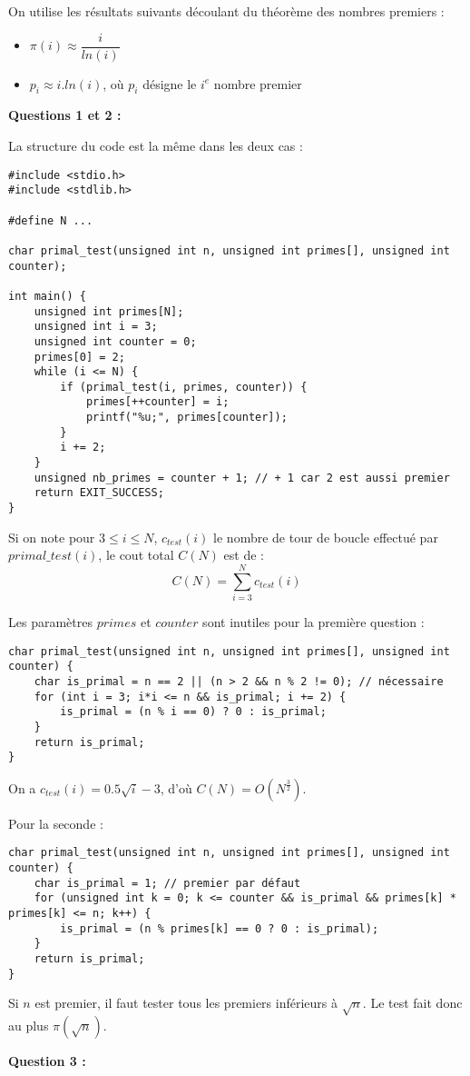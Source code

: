 \documentclass[../main.tex]{subfiles}
\begin{document}
On utilise les résultats suivants découlant du théorème des nombres premiers :
\begin{itemize}
	\item $\pi(i)\approx \dfrac{i}{ln(i)}$
	\item $p_i\approx i.ln(i)$, où $p_i$ désigne le $i^e$ nombre premier
\end{itemize}
\textbf{Questions 1 et 2 :}

La structure du code est la même dans les deux cas :
\begin{verbatim}
#include <stdio.h>
#include <stdlib.h>

#define N ...

char primal_test(unsigned int n, unsigned int primes[], unsigned int counter);

int main() {
	unsigned int primes[N];
	unsigned int i = 3;
	unsigned int counter = 0;
	primes[0] = 2;
	while (i <= N) {
		if (primal_test(i, primes, counter)) {
			primes[++counter] = i;
			printf("%u;", primes[counter]);
		}
		i += 2;
	}
	unsigned nb_primes = counter + 1; // + 1 car 2 est aussi premier
	return EXIT_SUCCESS;
}
\end{verbatim}
Si on note pour $3\leq i\leq N$, $c_{test}(i)$ le nombre de tour de boucle effectué par $primal\_test(i)$, le cout total $C(N)$ est de :
$$C(N) = \displaystyle\sum_{i=3}^{N}c_{test}(i)$$

Les paramètres $primes$ et $counter$ sont inutiles pour la première question :
\begin{verbatim}
char primal_test(unsigned int n, unsigned int primes[], unsigned int counter) {
	char is_primal = n == 2 || (n > 2 && n % 2 != 0); // nécessaire
	for (int i = 3; i*i <= n && is_primal; i += 2) {
		is_primal = (n % i == 0) ? 0 : is_primal;
	}
	return is_primal;
}
\end{verbatim}
On  a $c_{test}(i) = 0.5\sqrt{i} - 3$, d'où $C(N) = O(N^{\frac{3}{2}})$.

Pour la seconde :
\begin{verbatim}
char primal_test(unsigned int n, unsigned int primes[], unsigned int counter) {
	char is_primal = 1; // premier par défaut
	for (unsigned int k = 0; k <= counter && is_primal && primes[k] * primes[k] <= n; k++) {
		is_primal = (n % primes[k] == 0 ? 0 : is_primal);
	}
	return is_primal;
}
\end{verbatim}
Si $n$ est premier, il faut tester tous les premiers inférieurs à $\sqrt{n}$. Le test fait donc au plus $\pi(\sqrt{n})$.

\textbf{Question 3 :}
\end{document}
